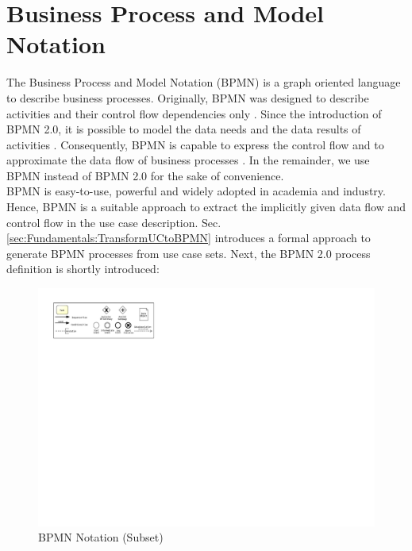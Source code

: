 \section{Business Process and Model Notation}
\label{sec:PrepApproach:BPMN}
The Business Process and Model Notation (BPMN) is a graph oriented language to describe business processes. Originally, BPMN was designed to describe activities and their control flow dependencies only \cite{VisualizeBPMN}. Since the introduction of BPMN 2.0, it is possible to model the data needs and the data results of activities \cite{OMG}. Consequently, BPMN is capable to express the control flow and to approximate the data flow of business processes \cite{DataFlowErrorBPMN}. In the remainder, we use BPMN instead of BPMN 2.0 for the sake of convenience. \\
BPMN is easy-to-use, powerful and widely adopted in academia and industry. Hence, BPMN is a suitable approach to extract the implicitly given data flow and control flow in the use case description. Sec.\ref{sec:Fundamentals:TransformUCtoBPMN} introduces a formal approach to generate BPMN processes from use case sets. Next, the BPMN 2.0 process definition is shortly introduced:


\begin{figure}[h!]
	\includegraphics[width=\textwidth, trim={1cm 16.5cm 19.2cm 1cm}]{img/Overview.pdf}
	\caption{BPMN Notation (Subset)}
	\label{fig:BPMNSubset}
\end{figure}

